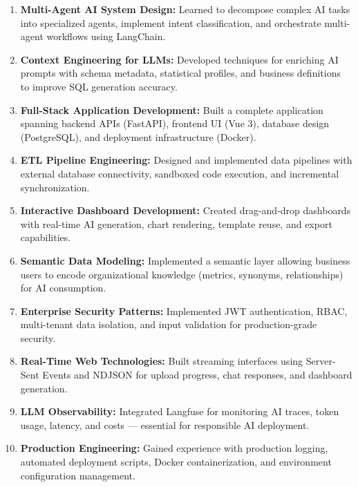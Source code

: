 \documentclass[12pt,a4paper]{report}
\begin{document}
\begin{enumerate}[leftmargin=1.5cm]
    \item \textbf{Multi-Agent AI System Design:} Learned to decompose complex AI tasks into specialized agents, implement intent classification, and orchestrate multi-agent workflows using LangChain.

    \item \textbf{Context Engineering for LLMs:} Developed techniques for enriching AI prompts with schema metadata, statistical profiles, and business definitions to improve SQL generation accuracy.

    \item \textbf{Full-Stack Application Development:} Built a complete application spanning backend APIs (FastAPI), frontend UI (Vue 3), database design (PostgreSQL), and deployment infrastructure (Docker).

    \item \textbf{ETL Pipeline Engineering:} Designed and implemented data pipelines with external database connectivity, sandboxed code execution, and incremental synchronization.

    \item \textbf{Interactive Dashboard Development:} Created drag-and-drop dashboards with real-time AI generation, chart rendering, template reuse, and export capabilities.

    \item \textbf{Semantic Data Modeling:} Implemented a semantic layer allowing business users to encode organizational knowledge (metrics, synonyms, relationships) for AI consumption.

    \item \textbf{Enterprise Security Patterns:} Implemented JWT authentication, RBAC, multi-tenant data isolation, and input validation for production-grade security.

    \item \textbf{Real-Time Web Technologies:} Built streaming interfaces using Server-Sent Events and NDJSON for upload progress, chat responses, and dashboard generation.

    \item \textbf{LLM Observability:} Integrated Langfuse for monitoring AI traces, token usage, latency, and costs --- essential for responsible AI deployment.

    \item \textbf{Production Engineering:} Gained experience with production logging, automated deployment scripts, Docker containerization, and environment configuration management.
\end{enumerate}
\end{document}
